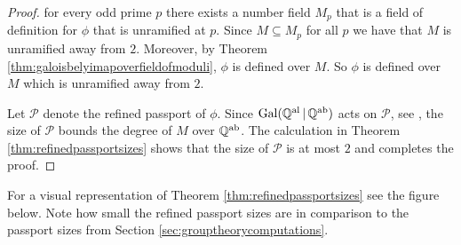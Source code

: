 \documentclass{dcthesis}
\newcommand{\QQal}{{\mathbb Q}^{\textup{al}}}
\newcommand{\QQab}{{\mathbb Q}^{\textup{ab}}}
\DeclareMathOperator{\Gal}{Gal}
\numberwithin{equation}{section}
\theoremstyle{definition}
\theoremstyle{remark}
\begin{document}
{{{\begin{proof}
      for every odd prime $p$
      there exists a number field
      $M_p$ that is a field of definition for $\phi$
      that is unramified at $p$.
      Since $M\subseteq M_p$ for all $p$
      we have that $M$ is unramified away from $2$.
      Moreover, by Theorem \ref{thm:galoisbelyimapoverfieldofmoduli},
      $\phi$ is defined over $M$.
      So $\phi$ is defined over $M$
      which is
      unramified away from $2$.
      \par
      Let $\mathscr{P}$ denote the refined passport of $\phi$.
      Since $\Gal(\QQal\,|\,\QQab)$ acts on $\mathscr{P}$,
      see \cite[Proposition 7.6]{SV},
      the size of $\mathscr{P}$ bounds the
      degree of $M$ over $\QQab$.
      The calculation in Theorem
      \ref{thm:refinedpassportsizes}
      shows that the size of $\mathscr{P}$ is at
      most $2$ and completes the proof.
    \end{proof}
    For a visual representation of Theorem
    \ref{thm:refinedpassportsizes} see
    the figure below.
    Note how small the refined passport sizes
    are in comparison
    to the passport sizes
    from Section \ref{sec:grouptheorycomputations}.
    \begin{figure}[ht]
      \centering
\end{figure}}}}
\end{document}
